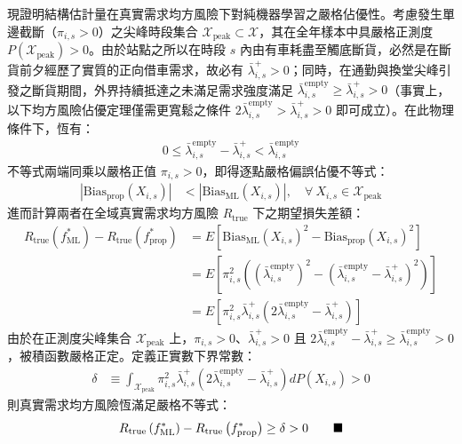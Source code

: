 現證明結構估計量在真實需求均方風險下對純機器學習之嚴格佔優性。考慮發生單邊截斷（$\pi_{i,s} > 0$）之尖峰時段集合 $\mathcal{X}_{\text{peak}} \subset \mathcal{X}$，其在全年樣本中具嚴格正測度 $P(\mathcal{X}_{\text{peak}}) > 0$。由於站點之所以在時段 $s$ 內由有車耗盡至觸底斷貨，必然是在斷貨前夕經歷了實質的正向借車需求，故必有 $\bar{\lambda}^+_{i,s} > 0$；同時，在通勤與換堂尖峰引發之斷貨期間，外界持續抵達之未滿足需求強度滿足 $\bar{\lambda}^{\text{empty}}_{i,s} \ge \bar{\lambda}^+_{i,s} > 0$（事實上，以下均方風險佔優定理僅需更寬鬆之條件 $2\bar{\lambda}^{\text{empty}}_{i,s} > \bar{\lambda}^+_{i,s} > 0$ 即可成立）。在此物理條件下，恆有：
\begin{align}
0 \le \bar{\lambda}^{\text{empty}}_{i,s} - \bar{\lambda}^+_{i,s} < \bar{\lambda}^{\text{empty}}_{i,s}
\end{align}
不等式兩端同乘以嚴格正值 $\pi_{i,s} > 0$，即得逐點嚴格偏誤佔優不等式：
\begin{align}
\left| \text{Bias}_{\text{prop}}(X_{i,s}) \right| &< \left| \text{Bias}_{\text{ML}}(X_{i,s}) \right|, \quad \forall\ X_{i,s} \in \mathcal{X}_{\text{peak}}
\end{align}
進而計算兩者在全域真實需求均方風險 $R_{\text{true}}$ 下之期望損失差額：
\begin{equation}
\begin{aligned}
R_{\text{true}}\left(f^*_{\text{ML}}\right) - R_{\text{true}}\left(f^*_{\text{prop}}\right) &= E\left[ \text{Bias}_{\text{ML}}(X_{i,s})^2 - \text{Bias}_{\text{prop}}(X_{i,s})^2 \right] \\
&= E\left[ \pi_{i,s}^2 \left( \left(\bar{\lambda}^{\text{empty}}_{i,s}\right)^2 - \left(\bar{\lambda}^{\text{empty}}_{i,s} - \bar{\lambda}^+_{i,s}\right)^2 \right) \right] \\
&= E\left[ \pi_{i,s}^2 \bar{\lambda}^+_{i,s} \left( 2\bar{\lambda}^{\text{empty}}_{i,s} - \bar{\lambda}^+_{i,s} \right) \right]
\end{aligned}
\end{equation}
由於在正測度尖峰集合 $\mathcal{X}_{\text{peak}}$ 上，$\pi_{i,s} > 0$、$\bar{\lambda}^+_{i,s} > 0$ 且 $2\bar{\lambda}^{\text{empty}}_{i,s} - \bar{\lambda}^+_{i,s} \ge \bar{\lambda}^{\text{empty}}_{i,s} > 0$，被積函數嚴格正定。定義正實數下界常數：
\begin{align}
\delta &\equiv \int_{\mathcal{X}_{\text{peak}}} \pi_{i,s}^2 \bar{\lambda}^+_{i,s} \left( 2\bar{\lambda}^{\text{empty}}_{i,s} - \bar{\lambda}^+_{i,s} \right) dP(X_{i,s}) > 0
\end{align}
則真實需求均方風險恆滿足嚴格不等式：
\begin{align}
R_{\text{true}}\left(f^*_{\text{ML}}\right) - R_{\text{true}}\left(f^*_{\text{prop}}\right) \ge \delta > 0 \tag*{\text{$\blacksquare$}}
\end{align}

